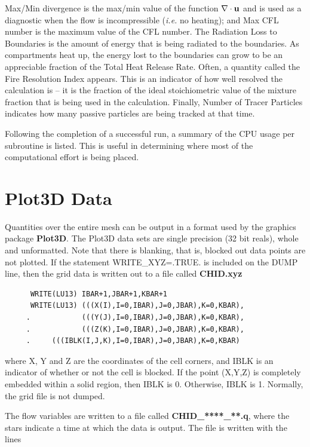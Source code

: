 \documentclass[11pt]{book}
\newcommand{\bu}{{\bf u}}
\begin{document}
{\ct Max/Min divergence} is the max/min value of the
function $\nabla \cdot \bu$ and is used as a diagnostic when the flow
is incompressible ({\em i.e.} no heating); and {\ct Max CFL number} is the
maximum value of the CFL number. The {\ct Radiation Loss to Boundaries} is the
amount of energy that is being radiated to the boundaries. As compartments
heat up, the energy lost to the boundaries can grow to be an appreciable
fraction of the {\ct Total Heat Release Rate}.
Often, a quantity called the {\ct Fire Resolution Index}
appears. This is an indicator of how well
resolved the calculation is -- it is the fraction of the ideal
stoichiometric value of the mixture fraction that is being used in
the calculation. Finally, {\ct Number of Tracer Particles} indicates
how many passive particles are being tracked at that time.

Following the completion of a successful run, a summary of the CPU
usage per subroutine is listed. This is useful in determining where
most of the computational effort is being placed.

\section{Plot3D Data}
\label{out:PL3D}

Quantities over the entire mesh can be output in a format used by the graphics package {\bf Plot3D}.
The Plot3D data sets are single precision (32 bit reals), whole and
unformatted. Note that there is blanking, that is,
blocked out data points are not plotted.
If the statement {\ct WRITE\_XYZ=.TRUE.} is included on the {\ct DUMP}
line, then the grid data is written out to a file called {\bf CHID.xyz}

\footnotesize
\begin{verbatim}
      WRITE(LU13) IBAR+1,JBAR+1,KBAR+1
      WRITE(LU13) (((X(I),I=0,IBAR),J=0,JBAR),K=0,KBAR),
     .            (((Y(J),I=0,IBAR),J=0,JBAR),K=0,KBAR),
     .            (((Z(K),I=0,IBAR),J=0,JBAR),K=0,KBAR),
     .     (((IBLK(I,J,K),I=0,IBAR),J=0,JBAR),K=0,KBAR)
\end{verbatim}
\normalsize
where {\ct X, Y} and {\ct Z} are the coordinates of the cell corners,
and {\ct IBLK} is an indicator of whether or not the cell is blocked.
If the point ({\ct X,Y,Z}) is completely embedded within a solid region,
then {\ct IBLK} is 0. Otherwise, {\ct IBLK} is 1. Normally, the grid
file is not dumped.

The flow variables are written to a file called {\bf CHID\_****\_**.q},
where the stars indicate a time at which the data is output.
The file is written with the lines
\end{document}
